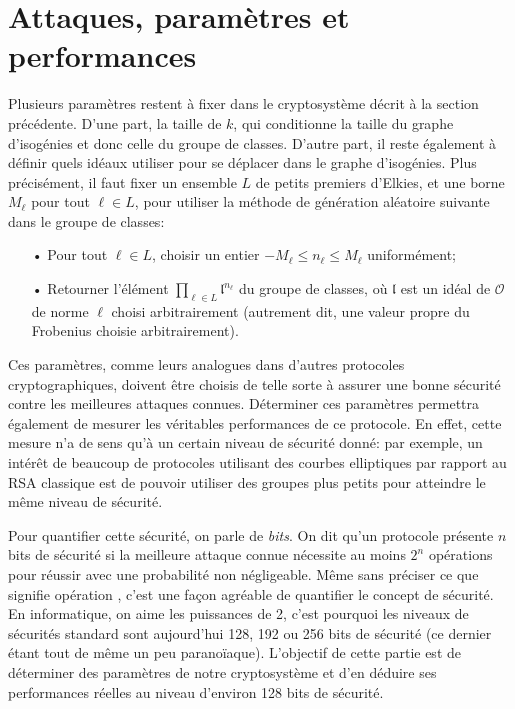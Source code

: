 \documentclass[11pt,a4paper]{article}
\renewcommand{\O}{\mathcal{O}}
\renewcommand{\frak}{\mathfrak}
\renewcommand{\v}{\vspace{5mm}}
\theoremstyle{definition}
\begin{document}
\newpage
\section{Attaques, paramètres et performances}

Plusieurs paramètres restent à fixer dans le cryptosystème décrit à la section précédente. D'une part, la taille de $k$, qui conditionne la taille du graphe d'isogénies et donc celle du groupe de classes. D'autre part, il reste également à définir quels idéaux utiliser pour se déplacer dans le graphe d'isogénies. Plus précisément, il faut fixer un ensemble $L$ de petits premiers d'Elkies, et une borne $M_\ell$ pour tout $\ell\in L$, pour utiliser la méthode de génération aléatoire suivante dans le groupe de classes:
\begin{itemize}
\item[•] Pour tout $\ell\in L$, choisir un entier $- M_\ell\leq n_\ell\leq M_\ell$ uniformément;
\item[•] Retourner l'élément $\prod_{\ell\in L} {\frak l}^{n_\ell}$ du groupe de classes, où $\frak l$ est un idéal de $\O$ de norme $\ell$ choisi arbitrairement (autrement dit, une valeur propre du Frobenius choisie arbitrairement).
\end{itemize}

Ces paramètres, comme leurs analogues dans d'autres protocoles cryptographiques, doivent être choisis de telle sorte à assurer une bonne sécurité contre les meilleures attaques connues. Déterminer ces paramètres permettra également de mesurer les véritables performances de ce protocole. En effet, cette mesure n'a de sens qu'à un certain niveau de sécurité donné: par exemple, un intérêt de beaucoup de protocoles utilisant des courbes elliptiques par rapport au RSA classique est de pouvoir utiliser des groupes plus petits pour atteindre le même niveau de sécurité.

\v
Pour quantifier cette sécurité, on parle de \emph{bits}. On dit qu'un protocole présente $n$ bits de sécurité si la meilleure attaque connue nécessite au moins $2^n$ opérations pour réussir avec une probabilité non négligeable. Même sans préciser ce que signifie \og opération \fg, c'est une façon agréable de quantifier le concept de sécurité. En informatique, on aime les puissances de 2, c'est pourquoi les niveaux de sécurités standard sont aujourd'hui 128, 192 ou 256 bits de sécurité (ce dernier étant tout de même un peu paranoïaque). L'objectif de cette partie est de déterminer des paramètres de notre cryptosystème et d'en déduire ses performances réelles au niveau d'environ 128 bits de sécurité.
\end{document}
